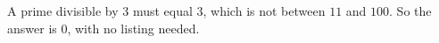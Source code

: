 A prime divisible by $3$ must equal $3$, which is not between $11$ and $100$. So the answer is $\boxed{0}$, with no listing needed.
